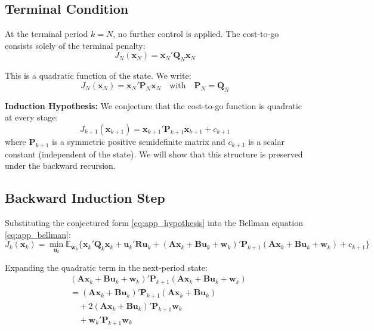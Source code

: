 \documentclass[12pt, a4paper]{article}
\begin{document}
\subsection{Terminal Condition}

At the terminal period $k = N$, no further control is applied. The 
cost-to-go consists solely of the terminal penalty:
\begin{equation}
    J_N(\bm{x}_N) = \bm{x}_N' \bm{Q}_N \bm{x}_N
    \label{eq:app_terminal}
\end{equation}

This is a quadratic function of the state. We write:
\begin{equation}
    J_N(\bm{x}_N) = \bm{x}_N' \bm{P}_N \bm{x}_N 
    \quad \text{with} \quad \bm{P}_N = \bm{Q}_N
    \label{eq:app_P_terminal}
\end{equation}

\textbf{Induction Hypothesis:} We conjecture that the cost-to-go 
function is quadratic at every stage:
\begin{equation}
    J_{k+1}(\bm{x}_{k+1}) = \bm{x}_{k+1}' \bm{P}_{k+1} \bm{x}_{k+1} 
    + c_{k+1}
    \label{eq:app_hypothesis}
\end{equation}
where $\bm{P}_{k+1}$ is a symmetric positive semidefinite matrix 
and $c_{k+1}$ is a scalar constant (independent of the state). We 
will show that this structure is preserved under the backward 
recursion.

\subsection{Backward Induction Step}

Substituting the conjectured form \eqref{eq:app_hypothesis} into 
the Bellman equation \eqref{eq:app_bellman}:
\begin{equation}
    J_k(\bm{x}_k) = \min_{\bm{u}_k} \mathbb{E}_{\bm{w}_k} 
    \Big\{ \bm{x}_k' \bm{Q}_k \bm{x}_k + \bm{u}_k' \bm{R} \bm{u}_k 
    + (\bm{A}\bm{x}_k + \bm{B}\bm{u}_k + \bm{w}_k)' \bm{P}_{k+1} 
    (\bm{A}\bm{x}_k + \bm{B}\bm{u}_k + \bm{w}_k) + c_{k+1} \Big\}
    \label{eq:app_substitute}
\end{equation}

Expanding the quadratic term in the next-period state:
\begin{align}
    &(\bm{A}\bm{x}_k + \bm{B}\bm{u}_k + \bm{w}_k)' \bm{P}_{k+1} 
    (\bm{A}\bm{x}_k + \bm{B}\bm{u}_k + \bm{w}_k) \nonumber \\
    &= (\bm{A}\bm{x}_k + \bm{B}\bm{u}_k)' \bm{P}_{k+1} 
    (\bm{A}\bm{x}_k + \bm{B}\bm{u}_k) \label{eq:app_expand1} \\
    &\quad + 2(\bm{A}\bm{x}_k + \bm{B}\bm{u}_k)' \bm{P}_{k+1} 
    \bm{w}_k \label{eq:app_expand2} \\
    &\quad + \bm{w}_k' \bm{P}_{k+1} \bm{w}_k \label{eq:app_expand3}
\end{align}
\end{document}
